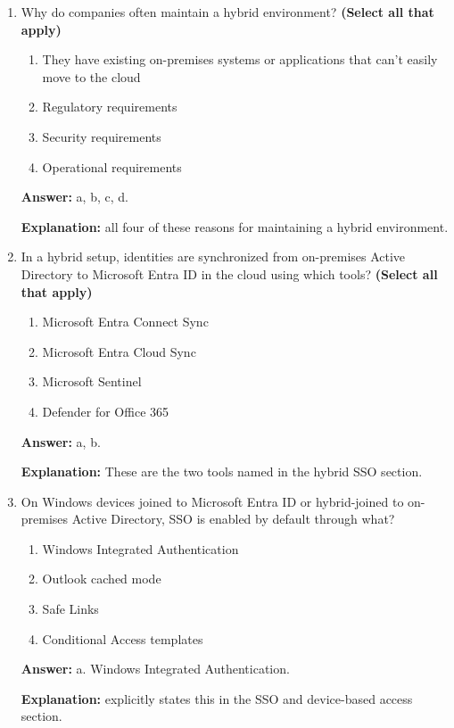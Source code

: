 \documentclass[10pt]{article}
\begin{document}
\begin{enumerate}[leftmargin=*]
\textbf{Explanation:} these organizations specifically.

\item Why do companies often maintain a hybrid environment? \textbf{(Select all that apply)}
\begin{enumerate}[label=\alph*., leftmargin=1.5em]
\item They have existing on-premises systems or applications that can’t easily move to the cloud
\item Regulatory requirements
\item Security requirements
\item Operational requirements
\end{enumerate}
\textbf{Answer:} a, b, c, d.

\textbf{Explanation:} all four of these reasons for maintaining a hybrid environment.

\item In a hybrid setup, identities are synchronized from on-premises Active Directory to Microsoft Entra ID in the cloud using which tools? \textbf{(Select all that apply)}
\begin{enumerate}[label=\alph*., leftmargin=1.5em]
\item Microsoft Entra Connect Sync
\item Microsoft Entra Cloud Sync
\item Microsoft Sentinel
\item Defender for Office 365
\end{enumerate}
\textbf{Answer:} a, b.

\textbf{Explanation:} These are the two tools named in the hybrid SSO section.

\item On Windows devices joined to Microsoft Entra ID or hybrid-joined to on-premises Active Directory, SSO is enabled by default through what?
\begin{enumerate}[label=\alph*., leftmargin=1.5em]
\item Windows Integrated Authentication
\item Outlook cached mode
\item Safe Links
\item Conditional Access templates
\end{enumerate}
\textbf{Answer:} a. Windows Integrated Authentication.

\textbf{Explanation:} explicitly states this in the SSO and device-based access section.


\end{enumerate}
\end{document}
